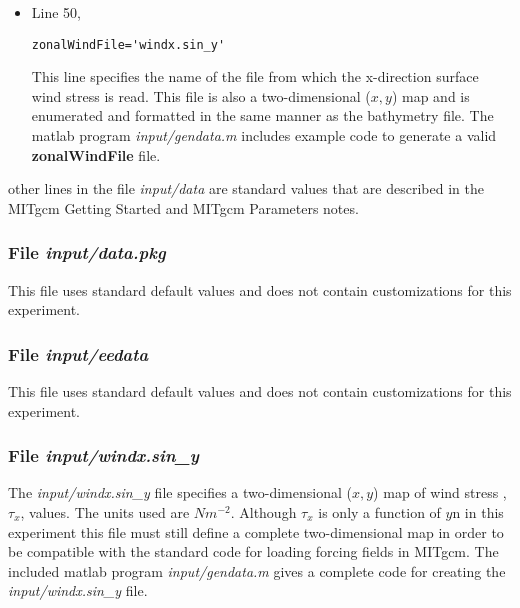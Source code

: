 \begin{itemize}
\item Line 50,
\begin{verbatim}
zonalWindFile='windx.sin_y'
\end{verbatim}
This line specifies the name of the file from which the x-direction
surface wind stress is read. This file is also a two-dimensional
($x,y$) map and is enumerated and formatted in the same manner as the 
bathymetry file. The matlab program {\it input/gendata.m} includes example 
code to generate a valid 
{\bf zonalWindFile} 
file.  

\end{itemize}

\noindent other lines in the file {\it input/data} are standard values
that are described in the MITgcm Getting Started and MITgcm Parameters
notes.

\begin{small}
% 
\end{small}

\subsubsection{File {\it input/data.pkg}}
\label{www:tutorials}

This file uses standard default values and does not contain
customizations for this experiment.

\subsubsection{File {\it input/eedata}}
\label{www:tutorials}

This file uses standard default values and does not contain
customizations for this experiment.

\subsubsection{File {\it input/windx.sin\_y}}
\label{www:tutorials}

The {\it input/windx.sin\_y} file specifies a two-dimensional ($x,y$) 
map of wind stress ,$\tau_{x}$, values. The units used are $Nm^{-2}$.
Although $\tau_{x}$ is only a function of $y$n in this experiment
this file must still define a complete two-dimensional map in order
to be compatible with the standard code for loading forcing fields 
in MITgcm. The included matlab program {\it input/gendata.m} gives a complete
code for creating the {\it input/windx.sin\_y} file.

